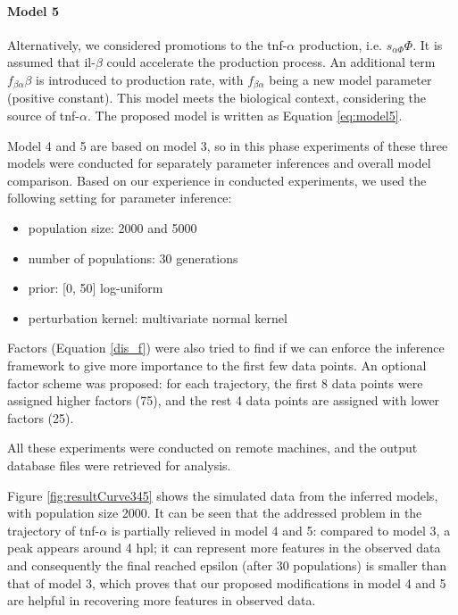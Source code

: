 \paragraph{Model 5} Alternatively, we considered promotions to the tnf-$\alpha$ production, i.e. $s_{\alpha\Phi}\Phi$. It is assumed that il-$\beta$ could accelerate the production process. An additional term $f_{\beta\alpha}\beta$ is introduced to production rate, with $f_{\beta\alpha}$ being a new model parameter (positive constant). This model meets the biological context, considering the source of tnf-$\alpha$. The proposed model is written as Equation \ref{eq:model5}.


Model 4 and 5 are based on model 3, so in this phase experiments of these three models were conducted for separately parameter inferences and overall model comparison. Based on our experience in conducted experiments, we used the following setting for parameter inference:

\begin{itemize}
    \item population size: 2000 and 5000
    \item number of populations: 30 generations
    \item prior: [0, 50] log-uniform
    \item perturbation kernel: multivariate normal kernel
\end{itemize}

Factors (Equation \ref{dis_f}) were also tried to find if we can enforce the inference framework to give more importance to the first few data points. An optional factor scheme was proposed: for each trajectory, the first 8 data points were assigned higher factors (75), and the rest 4 data points are assigned with lower factors (25).

All these experiments were conducted on remote machines, and the output database files were retrieved for analysis.

Figure \ref{fig:resultCurve345} shows the simulated data from the inferred models, with population size 2000. It can be seen that the addressed problem in the trajectory of tnf-$\alpha$ is partially relieved in model 4 and 5: compared to model 3, a peak appears around 4 hpl; it can represent more features in the observed data and consequently the final reached epsilon (after 30 populations) is smaller than that of model 3, which proves that our proposed modifications in model 4 and 5 are helpful in recovering more features in observed data.

